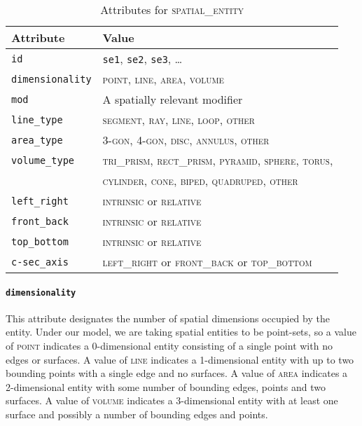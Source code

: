 \documentclass[11pt]{article}
\newenvironment{attributes}
{
\begin{tabular}{|l|l|}
    \hline \textbf{Attribute} & \textbf{Value}\\
}
{   \hline
\end{tabular}
}
\begin{document}
\begin{table}[h]
\centering
\begin{attributes}
    \hline \texttt{id}                  & \texttt{se1}, \texttt{se2}, 
                                          \texttt{se3}, \ldots\\
    \hline \texttt{dimensionality}      & \textsc{point}, \textsc{line}, \textsc{area}, \textsc{volume}\\
    \hline \texttt{mod}                 & A spatially relevant modifier\\
    \hline \texttt{line\_type}          & \textsc{segment}, \textsc{ray}, \textsc{line}, \textsc{loop}, \textsc{other}\\
    \hline \texttt{area\_type}          & \textsc{3-gon}, \textsc{4-gon}, \textsc{disc}, \textsc{annulus}, \textsc{other}\\
    \hline \texttt{volume\_type}        & \textsc{tri\_prism}, \textsc{rect\_prism}, \textsc{pyramid}, \textsc{sphere}, \textsc{torus},\\
                                        & \textsc{cylinder}, \textsc{cone}, \textsc{biped}, \textsc{quadruped}, \textsc{other}\\
    \hline \texttt{left\_right}         & \textsc{intrinsic} or \textsc{relative}\\
    \hline \texttt{front\_back}         & \textsc{intrinsic} or \textsc{relative}\\
    \hline \texttt{top\_bottom}         & \textsc{intrinsic} or \textsc{relative}\\
    \hline \texttt{c-sec\_axis}        & \textsc{left\_right} or \textsc{front\_back} or \textsc{top\_bottom}\\
\end{attributes}
\caption{Attributes for \textsc{spatial\_entity}}
\label{tab:spatial_entity}
\end{table}

\paragraph{\texttt{dimensionality}} %
\label{par:dimensionality}
This attribute designates the number of spatial dimensions occupied by the entity. Under our model, we are taking spatial entities to be point-sets, so a value of \textsc{point} indicates a 0-dimensional entity consisting of a single point with no edges or surfaces. A value of \textsc{line} indicates a 1-dimensional entity with up to two bounding points with a single edge and no surfaces. A value of \textsc{area} indicates a 2-dimensional entity with some number of bounding edges, points and two surfaces. A value of \textsc{volume} indicates a 3-dimensional entity with at least one surface and possibly a number of bounding edges and points.
\end{document}
